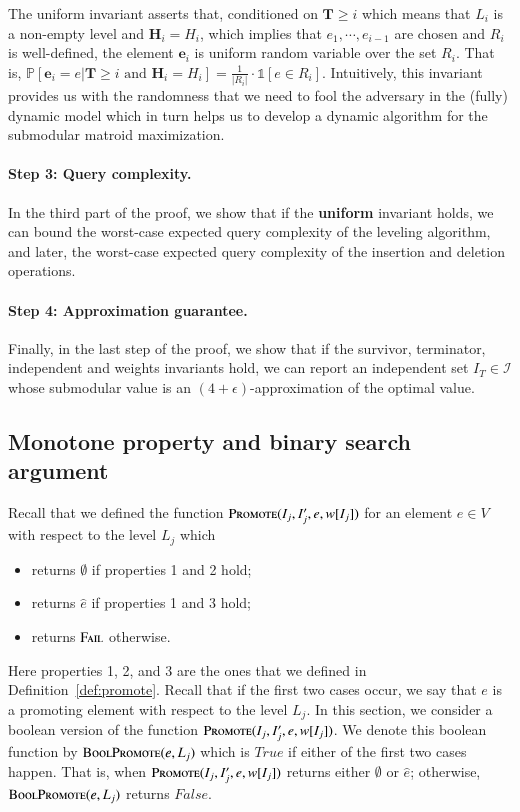 \documentclass[11pt]{article}
\renewcommand{\Pr}[1]{\ensuremath{\mathbb{P}\left[#1\right]}}
\newcommand{\ind}[1]{\ensuremath{\mathds{1}\left[#1\right]}}
\newcommand{\err}{{\textsc{Fail}}}
\newcommand{\suit}{\textsc{Promote}}
\newcommand{\boolsuit}{\textsc{BoolPromote}}
\newcommand{\bE}{\ensuremath{\mathbf{e}}}
\newcommand{\bT}{\ensuremath{\mathbf{T}}}
\newcommand{\bH}{\ensuremath{\mathbf{H}}}
\begin{document}
The uniform invariant asserts that, conditioned on $\bT \geq i$ which means that $L_{i}$ is a non-empty level and $\bH_i = H_i$, which implies that $e_1, \cdots, e_{i - 1}$ are chosen and $R_i$ is well-defined, the element $\bE_i$ is uniform random variable over the set $R_i$. That is, $\Pr{\bE_i = e | \bT \geq i \text{ and } \bH_i = H_i } = \frac{1}{|R_i|} \cdot \ind{e \in R_i}$.
Intuitively, this invariant provides us with the randomness that we need  
to fool the adversary in the (fully) dynamic model 
which in turn helps us to develop a dynamic algorithm 
for the submodular matroid maximization. 






\paragraph{Step 3: Query complexity.}
In the third part of the proof, 
we show that if the \textbf{uniform} invariant holds, we can bound 
the worst-case expected query complexity of the leveling algorithm, and later,  
the worst-case expected query complexity of the insertion and deletion operations. 
\paragraph{Step 4: Approximation guarantee.}
Finally, in the last step of the proof, we show that if the survivor, terminator, independent and 
weights invariants hold, we can report an independent set $I_T \in \mathcal{I}$ 
whose submodular value is an $(4+\epsilon)$-approximation of the optimal value. 



\subsection{Monotone property and binary search argument}
\label{sec:binary:search}
Recall that we defined the function 
$\suit(I_j, I'_j, e, w[I_j])$ for an element $e \in V$ 
with respect to the level $L_j$ which 
\begin{itemize}
    \item returns $\emptyset$ if properties 1 and 2 hold;
    \item returns $\hat{e}$ if properties 1 and 3 hold;
    \item returns $\err$ otherwise.
\end{itemize}
Here properties 1, 2, and 3 are the ones that we defined in Definition~\ref{def:promote}.
Recall that if the first two cases occur, we say that $e$ 
is a promoting element with respect to the level $L_j$. 
In this section, we consider a boolean version of the function $\suit(I_j, I'_j, e, w[I_j])$. 
We denote this boolean function by $\boolsuit(e,L_j)$ which is 
$True$ if either of the first two cases happen. That is, 
when $\suit(I_j, I'_j, e, w[I_j])$ returns either $\emptyset$ or $\hat{e}$; 
otherwise, $\boolsuit(e,L_j)$ returns $False$. 
\end{document}
